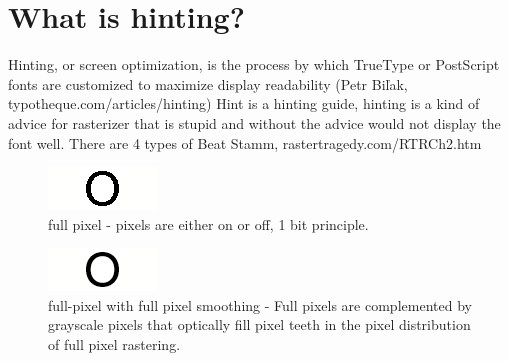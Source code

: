 \documentclass[a4paper]{article}
\begin{document}
\section{What is hinting?}

Hinting, or screen optimization, is the process by which TrueType or PostScript fonts are customized to maximize display readability (Petr Biľak, typotheque.com/articles/hinting) Hint is a hinting guide, hinting is a kind of advice for rasterizer that is stupid and without the advice would not display the font well. There are 4 types of Beat Stamm, rastertragedy.com/RTRCh2.htm

\begin{figure} [H]
  \includegraphics [width =\linewidth]{pics/o_1bit.png}
  \caption{full pixel - pixels are either on or off, 1 bit principle.}
\end{figure}

\begin{figure} [H]
  \includegraphics [width =\linewidth]{pics/1bit_fullanti.png}
  \caption{full-pixel with full pixel smoothing - Full pixels are complemented by grayscale pixels that optically fill pixel teeth in the pixel distribution of full pixel rastering.}
\end{figure}
\end{document}
